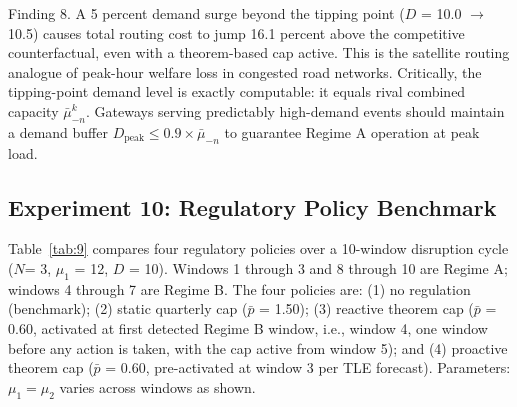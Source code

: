\documentclass[review,3p,authoryear]{elsarticle}
\begin{document}
Finding 8. A 5 percent demand surge beyond the tipping point ($D$ = 10.0 \ensuremath{\to} 10.5) causes total routing cost to jump 16.1 percent above the competitive counterfactual, even with a theorem-based cap active. This is the satellite routing analogue of peak-hour welfare loss in congested road networks. Critically, the tipping-point demand level is exactly computable: it equals rival combined capacity $\ensuremath{\bar{{\mu}}}_{-n}^{k}$. Gateways serving predictably high-demand events should maintain a demand buffer $D_{\mathrm{peak}} {\le} 0.9 {\times} \ensuremath{\bar{{\mu}}}_{-n}$ to guarantee Regime A operation at peak load.

\subsection{Experiment 10: Regulatory Policy Benchmark}
\label{sec6.10}

Table~\ref{tab:9} compares four regulatory policies over a 10-window disruption cycle ($N$= 3, ${\mu}_{1}$ = 12, $D$ = 10). Windows 1 through 3 and 8 through 10 are Regime A; windows 4 through 7 are Regime B. The four policies are: (1) no regulation (benchmark); (2) static quarterly cap (\ensuremath{\bar{p}} = 1.50); (3) reactive theorem cap (\ensuremath{\bar{p}} = 0.60, activated at first detected Regime B window, i.e., window 4, one window before any action is taken, with the cap active from window 5); and (4) proactive theorem cap (\ensuremath{\bar{p}} = 0.60, pre-activated at window 3 per TLE forecast). Parameters: ${\mu}_{1} = {\mu}_{2}$ varies across windows as shown.
\end{document}
